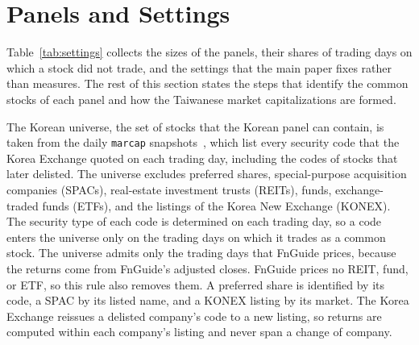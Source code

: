 \documentclass[a4paper,fleqn]{cas-sc}
\begin{document}
\section{Panels and Settings}\label{si:settings}

Table~\ref{tab:settings} collects the sizes of the panels, their shares of trading days on which a stock did not trade, and the settings that the main paper fixes rather than measures. The rest of this section states the steps that identify the common stocks of each panel and how the Taiwanese market capitalizations are formed.

The Korean universe, the set of stocks that the Korean panel can contain, is taken from the daily \texttt{marcap} snapshots~\citep{marcap2024}, which list every security code that the Korea Exchange quoted on each trading day, including the codes of stocks that later delisted. The universe excludes preferred shares, special-purpose acquisition companies (SPACs), real-estate investment trusts (REITs), funds, exchange-traded funds (ETFs), and the listings of the Korea New Exchange (KONEX). The security type of each code is determined on each trading day, so a code enters the universe only on the trading days on which it trades as a common stock. The universe admits only the trading days that FnGuide prices, because the returns come from FnGuide's adjusted closes. FnGuide prices no REIT, fund, or ETF, so this rule also removes them. A preferred share is identified by its code, a SPAC by its listed name, and a KONEX listing by its market. The Korea Exchange reissues a delisted company's code to a new listing, so returns are computed within each company's listing and never span a change of company.
\end{document}
